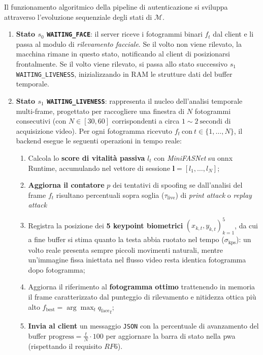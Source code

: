 Il funzionamento algoritmico della pipeline di autenticazione si sviluppa attraverso l'evoluzione sequenziale degli stati di $\mathcal{M}$.
\begin{enumerate}
    \item \textbf{Stato $s_0$ \texttt{WAITING\_FACE}}: il server riceve i fotogrammi binari $f_t$ dal client e li passa al modulo di \textit{rilevamento facciale}. Se il volto non viene rilevato, la macchina rimane in questo stato, notificando al client di posizionarsi frontalmente. Se il volto viene rilevato, si passa allo stato successivo $s_1$ \texttt{WAITING\_LIVENESS}, inizializzando in RAM le strutture dati del buffer temporale.
    \item \textbf{Stato $s_1$ \texttt{WAITING\_LIVENESS}}: rappresenta il nucleo dell'analisi temporale multi-frame, progettato per raccogliere una finestra di $N$ fotogrammi consecutivi (con $N \in [30,60]$ corrispondenti a circa $1\sim2~\text{secondi}$ di acquisizione video). Per ogni fotogramma ricevuto $f_t~\text{con}~t \in \{1, \dots, N\}$, il backend esegue le seguenti operazioni in tempo reale: \begin{enumerate}
        \item Calcola lo \textbf{score di vitalità passiva} $l_t$ con \textit{MiniFASNet} su \gls{onnx} Runtime, accumulando nel vettore di sessione $\mathbf{l} = [l_1, \dots, l_N]$;
        \item \textbf{Aggiorna il contatore} $p$ dei tentativi di spoofing se dall'analisi del frame $f_t$ risultano percentuali sopra soglia ($\tau_{\text{live}}$) di \textit{print attack} o \textit{replay attack}
        \item Registra la posizione dei \textbf{5 keypoint biometrici} ${(x_{k,t}, y_{k,t})}_{k=1}^{5}$, da cui a fine buffer si stima quanto la testa abbia ruotato nel tempo ($\sigma_{\text{kps}}$): un volto reale presenta sempre piccoli movimenti naturali, mentre un'immagine fissa iniettata nel flusso video resta identica fotogramma dopo fotogramma;
        \item Aggiorna il riferimento al \textbf{fotogramma ottimo} trattenendo in memoria il frame caratterizzato dal punteggio di rilevamento e nitidezza ottica più alto $f_{\text{best}} = \arg\max_{t} {q_{\text{face}}}_t$;
        \item \textbf{Invia al client} un messaggio \texttt{JSON} con la percentuale di avanzamento del buffer $\text{progress} = \frac{t}{N} \cdot 100$ per aggiornare la barra di stato nella \gls{pwa} (rispettando il requisito $RF6$).
    \end{enumerate}

\end{enumerate}
